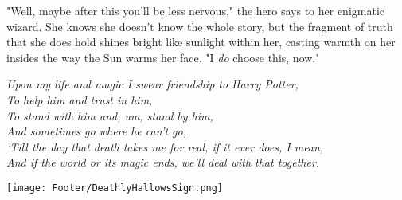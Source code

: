 "Well, maybe after this you'll be less nervous," the hero says to her enigmatic
wizard. She knows she doesn't know the whole story, but the fragment of truth
that she does hold shines bright like sunlight within her, casting warmth on
her insides the way the Sun warms her face. "I \emph{do} choose this, now."

\begin{samepage}
\vspace*{1\baselineskip}

\noindent{}\emph{Upon my life and magic I swear friendship to Harry Potter,}\\
\emph{To help him and trust in him,}\\
\emph{To stand with him and, um, stand by him,}\\
\emph{And sometimes go where he can't go,}\\
\emph{'Till the day that death takes me for real, if it ever does, I mean,}\\
\emph{And if the world or its magic ends, we'll deal with that together.}

\vspace*{2\baselineskip}

\begin{center}
\texttt{[image: Footer/DeathlyHallowsSign.png]}
\end{center}
\end{samepage}

\clearpage
